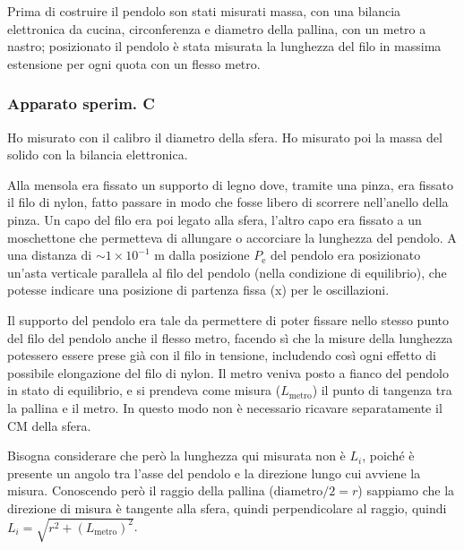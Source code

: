 \documentclass[italian, a4paper, 10pt, twocolumn]{../../style/lab_unige}
\begin{document}
  Prima di costruire il pendolo 
  son stati misurati massa, con una bilancia elettronica da cucina, circonferenza e diametro della pallina, 
  con un metro a nastro; posizionato il pendolo è stata misurata la lunghezza del filo in massima estensione 
  per ogni quota con un flesso metro. 
  


  \subsubsection{Apparato sperim. C}
  \label{section:app_s_c}
  Ho misurato con il calibro il diametro della sfera.
  Ho misurato poi la massa del solido con la bilancia elettronica.

  Alla mensola era fissato un supporto di legno dove, tramite una pinza, era fissato il filo di nylon, fatto
  passare in modo che fosse libero di scorrere nell'anello della pinza. Un capo del filo era poi legato alla
  sfera, l'altro capo era fissato a un moschettone che permetteva di allungare o accorciare la lunghezza del 
  pendolo. A una distanza di $\sim1\times10^{-1}$ m dalla posizione $P_{\text{e}}$ del pendolo era
  posizionato un'asta verticale parallela al filo del pendolo (nella condizione di equilibrio), che potesse
  indicare una posizione di partenza fissa (x) per le oscillazioni. 

  Il supporto del pendolo era tale da permettere di poter fissare nello stesso punto del filo del pendolo 
  anche il flesso metro, facendo sì che la misure della lunghezza potessero essere prese già con il filo in 
  tensione, includendo così ogni effetto di possibile elongazione del filo di nylon. Il metro veniva posto 
  a fianco del pendolo in stato di equilibrio, e si prendeva come misura ($L_{\text{metro}}$) il punto di 
  tangenza tra la pallina e il metro. 
  In questo modo non è necessario ricavare separatamente il CM della sfera.

  Bisogna considerare che però la lunghezza qui misurata non è $L_{i}$, poiché è presente un angolo tra l'asse
  del pendolo e la direzione lungo cui avviene la misura. Conoscendo però il raggio della pallina 
  ($\text{diametro}/2=r$) sappiamo che la direzione di misura è tangente alla sfera, quindi perpendicolare al 
  raggio, quindi $L_{i}=\sqrt{r^{2}+(L_{\text{metro}})^{2}}$. 
\end{document}
